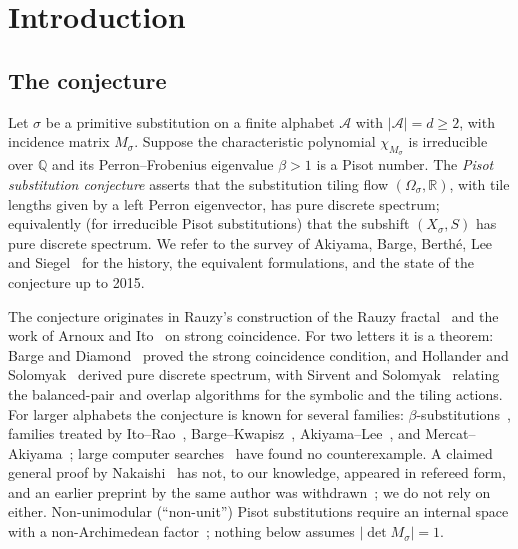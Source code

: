 \documentclass[11pt]{amsart}
\theoremstyle{plain}
\theoremstyle{definition}
\theoremstyle{remark}
\newcommand{\Q}{\mathbb{Q}}
\newcommand{\R}{\mathbb{R}}
\newcommand{\A}{\mathcal{A}}
\newcommand{\PDS}{pure discrete spectrum}
\begin{document}
\maketitle
\tableofcontents

\section{Introduction}\label{sec:intro}

\subsection{The conjecture}
Let $\sigma$ be a primitive substitution on a finite alphabet $\A$ with $|\A|=d\ge 2$, with incidence matrix $M_\sigma$. Suppose the characteristic polynomial $\chi_{M_\sigma}$ is irreducible over $\Q$ and its Perron--Frobenius eigenvalue $\beta>1$ is a Pisot number. The \emph{Pisot substitution conjecture} asserts that the substitution tiling flow $(\Omega_\sigma,\R)$, with tile lengths given by a left Perron eigenvector, has \PDS; equivalently (for irreducible Pisot substitutions) that the subshift $(X_\sigma,S)$ has \PDS{}. We refer to the survey of Akiyama, Barge, Berth\'e, Lee and Siegel~\cite{ABBLS} for the history, the equivalent formulations, and the state of the conjecture up to 2015.

The conjecture originates in Rauzy's construction of the Rauzy fractal~\cite{Rauzy} and the work of Arnoux and Ito~\cite{AI} on strong coincidence. For two letters it is a theorem: Barge and Diamond~\cite{BD} proved the strong coincidence condition, and Hollander and Solomyak~\cite{HS} derived \PDS{}, with Sirvent and Solomyak~\cite{SS} relating the balanced-pair and overlap algorithms for the symbolic and the tiling actions. For larger alphabets the conjecture is known for several families: $\beta$-substitutions~\cite{Barge2018}, families treated by Ito--Rao~\cite{IR}, Barge--Kwapisz~\cite{BK}, Akiyama--Lee~\cite{AL}, and Mercat--Akiyama~\cite{MA}; large computer searches~\cite{BalchinRust} have found no counterexample. A claimed general proof by Nakaishi~\cite{Nakaishi2024} has not, to our knowledge, appeared in refereed form, and an earlier preprint by the same author was withdrawn~\cite{Nakaishi2016}; we do not rely on either. Non-unimodular (``non-unit'') Pisot substitutions require an internal space with a non-Archimedean factor~\cite{MT,BBK}; nothing below assumes $|\det M_\sigma|=1$.
\end{document}
